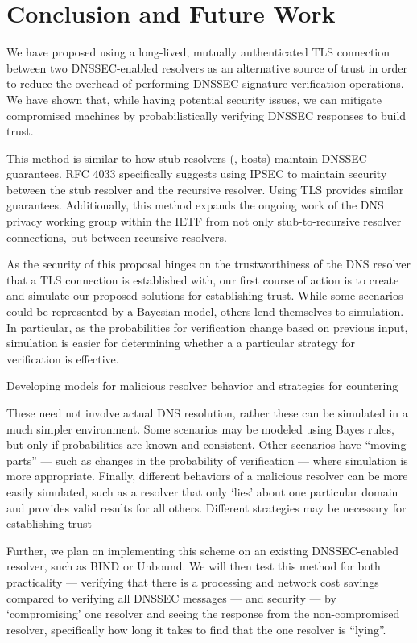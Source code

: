 \section{Conclusion and Future Work}\label{sec:conclusion}

We have proposed using a long-lived, mutually authenticated TLS connection
between two DNSSEC-enabled resolvers as an alternative source of trust in order
to reduce the overhead of performing DNSSEC signature  verification operations.
We have shown that, while having potential security issues, we can mitigate 
compromised machines by probabilistically verifying DNSSEC responses to build 
trust.

This method is similar to how stub resolvers (\ie, hosts) maintain DNSSEC 
guarantees. RFC 4033 specifically suggests using IPSEC to maintain security
between the stub resolver and the recursive resolver.\cite{rfc4033} Using TLS
provides similar guarantees. Additionally, this method expands the ongoing work
of the DNS privacy working group within the IETF from not only stub-to-recursive
resolver connections, but between recursive resolvers.

As the security of this proposal hinges on the trustworthiness of the DNS 
resolver that a TLS connection is established with, our first course of action 
is to create and simulate our proposed solutions for establishing trust. 
While some scenarios could be represented by a Bayesian model, others lend 
themselves to simulation. In particular, as the probabilities for verification 
change based on previous input, simulation is easier for determining whether a
a particular strategy for verification is effective.

Developing models for malicious resolver behavior and strategies for countering


These
need not involve actual DNS resolution, rather these can be simulated in a much
simpler environment. Some scenarios may be modeled using Bayes rules, but only
if probabilities are known and consistent. Other scenarios have ``moving 
parts'' --- such as changes in the probability of verification --- where 
simulation is more appropriate. Finally, different behaviors of a malicious 
resolver can be more easily simulated, such as a resolver that only `lies' about
one particular domain and provides valid results for all others. Different 
strategies may be necessary for establishing trust 

Further, we plan on implementing this scheme on an existing 
DNSSEC-enabled resolver, such as BIND or Unbound. 
We will then test this method for both
practicality --- verifying that there is a processing and network  cost savings 
compared to verifying all DNSSEC messages --- and security --- by `compromising'
one resolver and seeing the response from the non-compromised resolver, 
specifically how long it takes to find that the one resolver is ``lying''.

